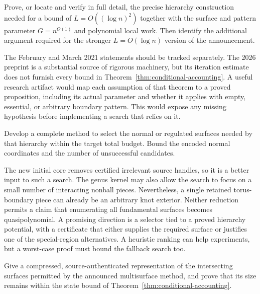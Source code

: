 \begin{problem}
\label{prob:global-depth}
Prove, or locate and verify in full detail, the precise hierarchy
construction needed for a bound of $L=O((\log n)^2)$ together with the
surface and pattern parameter $G=n^{O(1)}$ and polynomial local work.
Then identify the additional argument required for the stronger
$L=O(\log n)$ version of the announcement.
\end{problem}

The February and March 2021 statements should be tracked separately.
The 2026 preprint is a substantial source of rigorous machinery, but
its iteration estimate does not furnish every bound in
Theorem~\ref{thm:conditional-accounting}.  A useful research artifact
would map each assumption of that theorem to a proved proposition,
including its actual parameter and whether it applies with empty,
essential, or arbitrary boundary pattern.  This would expose any missing
hypothesis before implementing a search that relies on it.

\begin{problem}
Develop a complete method to select the normal or regulated surfaces
needed by that hierarchy within the target total budget.  Bound the
encoded normal coordinates and the number of unsuccessful candidates.
\end{problem}

The new initial core removes certified irrelevant source handles, so
it is a better input to such a search.  The genus kernel may also allow
the search to focus on a small number of interacting nonball pieces.
Nevertheless, a single retained torus-boundary piece can already be
an arbitrary knot exterior.  Neither reduction permits a claim that
enumerating all fundamental surfaces becomes quasipolynomial.
A promising direction is a selector tied to a proved hierarchy potential,
with a certificate that either supplies the required surface or justifies
one of the special-region alternatives.  A heuristic ranking can help
experiments, but a worst-case proof must bound the fallback search too.

\begin{problem}
Give a compressed, source-authenticated representation of the intersecting
surfaces permitted by the announced multisurface method, and prove that
its size remains within the state bound of
Theorem~\ref{thm:conditional-accounting}.
\end{problem}

